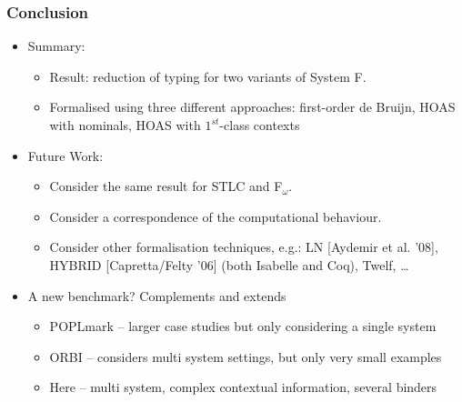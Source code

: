 \documentclass[english,pdftex,dvipsnames,leqno,handout]{beamer}%
\newcommand{\mycite}[1]{{\color{greenblue}\scriptsize[#1]}}
\begin{document}
\begin{frame}
  \frametitle{Conclusion}
  \begin{itemize}
  \item Summary:
    \begin{itemize}
    \item Result: reduction of typing for two variants of System F.
    \item Formalised using three different approaches: first-order de Bruijn, HOAS with nominals, HOAS with $1^{st}$-class contexts
    \end{itemize}
  \item Future Work:
    \begin{itemize}
    \item Consider the same result for STLC and F$_\omega$.
    \item Consider a correspondence of the computational behaviour.
    \item Consider other formalisation techniques, e.g.: LN \mycite{Aydemir et al. '08}, HYBRID \mycite{Capretta/Felty '06} (both Isabelle and Coq), Twelf, \ldots
    \end{itemize}
  \item A new benchmark? Complements and extends
    \begin{itemize}
    \item POPLmark -- larger case studies but only considering a single system
    \item ORBI -- considers multi system settings, but only very small examples
    \item Here -- multi system, complex contextual information, several binders
    \end{itemize}
  \end{itemize}
\end{frame}
\end{document}
